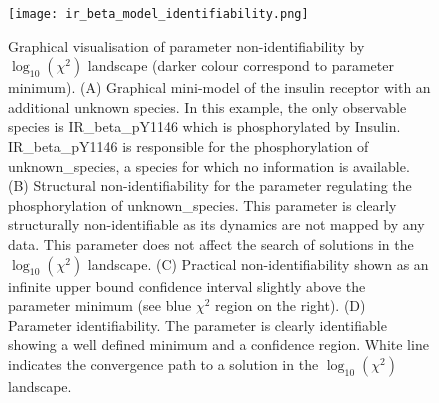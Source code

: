 \begin{figure}[tb]
	\begin{center}
 		\texttt{[image: ir\_beta\_model\_identifiability.png]}
		\caption[Graphical visualisation of parameter non-identifiability]{Graphical visualisation of parameter non-identifiability by $\log_{10}(\chi^2)$ landscape (darker colour correspond to parameter minimum). (A) Graphical mini-model of the insulin receptor with an additional unknown species. In this example, the only observable species is IR\_beta\_pY1146 which is phosphorylated by Insulin. IR\_beta\_pY1146 is responsible for the phosphorylation of unknown\_species, a species for which no information is available. (B) Structural non-identifiability for the parameter regulating the phosphorylation of unknown\_species. This parameter is clearly structurally non-identifiable as its dynamics are not mapped by any data. This parameter does not affect the search of solutions in the $\log_{10}(\chi^2)$ landscape. (C) Practical non-identifiability shown as an infinite upper bound confidence interval slightly above the parameter minimum (see blue $\chi^2$ region on the right). (D) Parameter identifiability. The 
parameter is clearly identifiable showing a well defined minimum and a confidence region. White line indicates the convergence path to a solution in the $\log_{10}(\chi^2)$ landscape.}
		\label{fig:landscape_identifiability}
	\end{center}
\end{figure}

